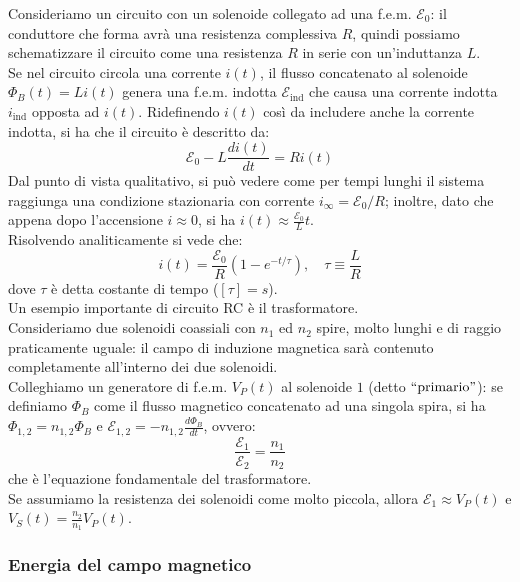 \documentclass[]{article}
\newcommand{\E}{\mathcal{E}}
\begin{document}
Consideriamo un circuito con un solenoide collegato ad una f.e.m. $ \E_0 $: il conduttore che forma avrà una resistenza complessiva $ R $, quindi possiamo schematizzare il circuito come una resistenza $ R $ in serie con un'induttanza $ L $. \\ 
Se nel circuito circola una corrente $ i(t) $, il flusso concatenato al solenoide $ \Phi_B(t) = Li(t) $ genera una f.e.m. indotta $ \E_{\text{ind}} $ che causa una corrente indotta $ i_{\text{ind}} $ opposta ad $ i(t) $. Ridefinendo $ i(t) $ così da includere anche la corrente indotta, si ha che il circuito è descritto da:
\begin{equation}
	\E_0 - L \frac{di(t)}{dt} = Ri(t)
	\label{eq:29}
\end{equation}
Dal punto di vista qualitativo, si può vedere come per tempi lunghi il sistema raggiunga una condizione stazionaria con corrente $ i_{\infty} = \E_0 / R $; inoltre, dato che appena dopo l'accensione $ i \approx 0 $, si ha $ i(t) \approx \frac{\E_0}{L} t $. \\ 
%
Risolvendo analiticamente si vede che:
\begin{equation}
	i(t) = \frac{\E_0}{R} (1 - e^{-t/\tau}), \quad \tau \equiv \frac{L}{R}
	\label{eq:30}
\end{equation}
dove $ \tau $ è detta costante di tempo ($ [\tau] = s $). \\ 
%
Un esempio importante di circuito RC è il trasformatore. \\ 
%
Consideriamo due solenoidi coassiali con $ n_1 $ ed $ n_2 $ spire, molto lunghi e di raggio praticamente uguale: il campo di induzione magnetica sarà contenuto completamente all'interno dei due solenoidi. \\ 
%
Colleghiamo un generatore di f.e.m. $ V_P(t) $ al solenoide $ 1 $ (detto $ ``\text{primario}" $): se definiamo $ \Phi_B $ come il flusso magnetico concatenato ad una singola spira, si ha $ \Phi_{1,2} = n_{1,2} \Phi_B $ e $ \E_{1,2} = - n_{1,2} \frac{d\Phi_B}{dt} $, ovvero:
\begin{equation}
	\frac{\E_1}{\E_2} = \frac{n_1}{n_2}
	\label{eq:31}
\end{equation}
che è l'equazione fondamentale del trasformatore. \\ 
%
Se assumiamo la resistenza dei solenoidi come molto piccola, allora $ \E_1 \approx V_P(t) $ e $ V_S(t) = \frac{n_2}{n_1}V_P(t) $.

\subsubsection{Energia del campo magnetico}
\end{document}
